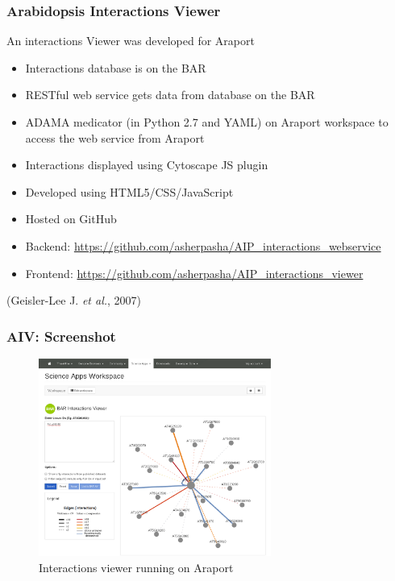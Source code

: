 \documentclass{beamer}
\begin{document}
	\begin{frame}
		\frametitle{Arabidopsis Interactions Viewer}
		An interactions Viewer was developed for Araport
		\begin{itemize}
			\item Interactions database is on the BAR
			\item RESTful web service gets data from database on the BAR
			\item ADAMA medicator (in Python 2.7 and YAML) on Araport workspace to access the web service from Araport
			\item Interactions displayed using Cytoscape JS plugin
			\item Developed using HTML5/CSS/JavaScript
			\item Hosted on GitHub
			\item Backend:	\url{https://github.com/asherpasha/AIP_interactions_webservice}
			\item Frontend: \url{https://github.com/asherpasha/AIP_interactions_viewer}
		\end{itemize}
		(Geisler-Lee J. \textit{et al.}, 2007)
	\end{frame}

	\begin{frame}
		\frametitle{AIV: Screenshot}
		\begin{figure}[!htb]
			\centering
			\includegraphics[width=3in]{AIV.eps}
			\caption{Interactions viewer running on Araport}
		\end{figure}

	\end{frame}
\end{document}
